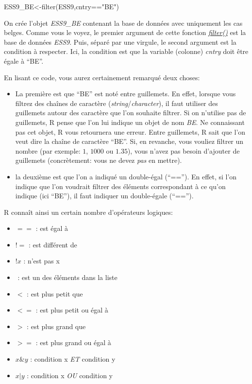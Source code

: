 \documentclass[
]{book}
\newenvironment{Shaded}{\begin{snugshade}}{\end{snugshade}}
\newcommand{\FunctionTok}[1]{\textcolor[rgb]{0.00,0.00,0.00}{#1}}
\newcommand{\NormalTok}[1]{#1}
\newcommand{\OtherTok}[1]{\textcolor[rgb]{0.56,0.35,0.01}{#1}}
\newcommand{\SpecialCharTok}[1]{\textcolor[rgb]{0.00,0.00,0.00}{#1}}
\newcommand{\StringTok}[1]{\textcolor[rgb]{0.31,0.60,0.02}{#1}}
\providecommand{\tightlist}{%
  \setlength{\itemsep}{0pt}\setlength{\parskip}{0pt}}
\begin{document}
\begin{Shaded}
\begin{Highlighting}[]
\NormalTok{ESS9\_BE}\OtherTok{\textless{}{-}}\FunctionTok{filter}\NormalTok{(ESS9,cntry}\SpecialCharTok{==}\StringTok{"BE"}\NormalTok{)}
\end{Highlighting}
\end{Shaded}

On crée l'objet \emph{ESS9\_BE} contenant la base de données avec uniquement les cas belges. Comme vous le voyez, le premier argument de cette fonction \href{https://dplyr.tidyverse.org/reference/filter.html}{\emph{filter()}} est la base de données \emph{ESS9}. Puis, séparé par une virgule, le second argument est la condition à respecter. Ici, la condition est que la variable (colonne) \emph{cntry} doit être égale à ``BE''.

En lisant ce code, vous aurez certainement remarqué deux choses:

\begin{itemize}
\item
  La première est que ``BE'' est noté entre guillemets. En effet, lorsque vous filtrez des chaînes de caractère (\emph{string}/\emph{character}), il faut utiliser des guillemets autour des caractère que l'on souhaite filtrer. Si on n'utilise pas de guillemets, R pense que l'on lui indique un objet de nom \emph{BE}. Ne connaissant pas cet objet, R vous retournera une erreur. Entre guillemets, R sait que l'on veut dire la chaîne de caractère ``BE''. Si, en revanche, vous vouliez filtrer un nombre (par exemple: \(1\), \(1000\) ou \(1.35\)), vous n'avez pas besoin d'ajouter de guillemets (concrètement: vous ne devez \emph{pas} en mettre).
\item
  la deuxième est que l'on a indiqué un double-égal (``==''). En effet, si l'on indique que l'on voudrait filtrer des éléments correspondant à ce qu'on indique (ici ``BE''), il faut indiquer un double-égale (``=='').
\end{itemize}

R connaît ainsi un certain nombre d'opérateurs logiques:

\begin{itemize}
\tightlist
\item
  \(==\) : est égal à
\item
  \(!=\) : est différent de
\item
  \(!x\) : n'est pas x
\item
  \(%
  \) : est un des éléments dans la liste
\item
  \(<\) : est plus petit que
\item
  \(<=\) : est plus petit ou égal à
\item
  \(>\) : est plus grand que
\item
  \(>=\) : est plus grand ou égal à
\item
  \(x \& y\) : condition x \emph{ET} condition y
\item
  \(x | y\) : condition x \emph{OU} condition y
\end{itemize}
\end{document}
